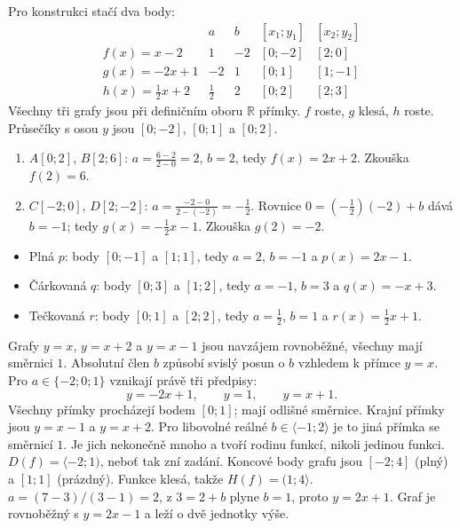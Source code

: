 \documentclass[11pt,a4paper]{article}
\begin{document}
Pro konstrukci stačí dva body:
\[
\begin{array}{c|cc|cc}
 & a & b & [x_1;y_1] & [x_2;y_2]\\\hline
f(x)=x-2 & 1 & -2 & [0;-2] & [2;0]\\
g(x)=-2x+1 & -2 & 1 & [0;1] & [1;-1]\\
h(x)=\frac12x+2 & \frac12 & 2 & [0;2] & [2;3]
\end{array}
\]
Všechny tři grafy jsou při definičním oboru $\mathbb R$ přímky.
$f$ roste, $g$ klesá, $h$ roste. Průsečíky s osou $y$ jsou
$[0;-2]$, $[0;1]$ a $[0;2]$.
\begin{enumerate}[label=\alph*)]
\item $A[0;2]$, $B[2;6]$: $a=\frac{6-2}{2-0}=2$, $b=2$,
      tedy $f(x)=2x+2$. Zkouška $f(2)=6$.
\item $C[-2;0]$, $D[2;-2]$: $a=\frac{-2-0}{2-(-2)}=-\frac12$.
      Rovnice $0=(-\frac12)(-2)+b$ dává $b=-1$;
      tedy $g(x)=-\frac12x-1$. Zkouška $g(2)=-2$.
\end{enumerate}
\begin{itemize}
\item Plná $p$: body $[0;-1]$ a $[1;1]$, tedy $a=2$, $b=-1$ a $p(x)=2x-1$.
\item Čárkovaná $q$: body $[0;3]$ a $[1;2]$, tedy $a=-1$, $b=3$ a $q(x)=-x+3$.
\item Tečkovaná $r$: body $[0;1]$ a $[2;2]$, tedy $a=\frac12$, $b=1$ a $r(x)=\frac12x+1$.
\end{itemize}
Grafy $y=x$, $y=x+2$ a $y=x-1$ jsou navzájem rovnoběžné, všechny mají směrnici $1$.
Absolutní člen $b$ způsobí svislý posun o $b$ vzhledem k přímce $y=x$.
Pro $a\in\{-2;0;1\}$ vznikají právě tři předpisy:
\[
 y=-2x+1,\qquad y=1,\qquad y=x+1.
\]
Všechny přímky procházejí bodem $[0;1]$; mají odlišné směrnice.
Krajní přímky jsou $y=x-1$ a $y=x+2$. Pro libovolné reálné
$b\in\langle-1;2\rangle$ je to jiná přímka se směrnicí $1$.
Je jich nekonečně mnoho a tvoří rodinu funkcí, nikoli jedinou funkci.
$D(f)=\langle-2;1)$, neboť tak zní zadání. Koncové body grafu jsou
$[-2;4]$ (plný) a $[1;1]$ (prázdný). Funkce klesá, takže
$H(f)=(1;4\rangle$.
$a=(7-3)/(3-1)=2$, z $3=2+b$ plyne $b=1$, proto $y=2x+1$.
Graf je rovnoběžný s $y=2x-1$ a leží o dvě jednotky výše.
\end{document}
